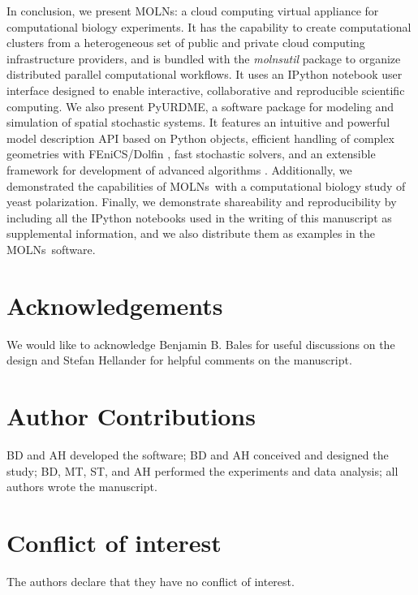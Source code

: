 \documentclass[final,leqno,onefignum,onetabnum]{siamltex1213}
\def\packagename {MOLNs}
\begin{document}
In conclusion, we present \packagename: a cloud computing virtual appliance for computational biology experiments.  It has the capability to create computational clusters from a heterogeneous set of public and private cloud computing infrastructure providers, and is bundled with the \emph{molnsutil} package to organize distributed parallel computational workflows. It uses an IPython notebook user interface designed to enable interactive, collaborative and reproducible scientific computing.
We also present PyURDME, a software package for modeling and simulation of spatial stochastic systems.  It features an intuitive and powerful model description API based on Python objects, efficient handling of complex geometries with FEniCS/Dolfin \cite{LoggMardalEtAl2012a}, fast stochastic solvers, and an extensible framework for development of advanced algorithms \cite{urdme, Drawert2010}.
Additionally, we demonstrated the capabilities of \packagename~with a computational biology study of yeast polarization.
Finally, we demonstrate shareability and reproducibility by including all the IPython notebooks used in the writing of this manuscript 
as supplemental information, and we also distribute them as examples in the \packagename~software. 






\section*{Acknowledgements}
\label{sec:Acknowledgements}
We would like to acknowledge Benjamin B. Bales for useful discussions on the design and Stefan Hellander for helpful comments on the manuscript.



\section*{Author Contributions}
BD and AH developed the software;
BD and AH conceived and designed the study; 
BD, MT, ST, and AH performed the experiments and data analysis; 
all authors wrote the manuscript.

\section*{Conflict of interest}

The authors declare that they have no conflict of interest.

 
\end{document}
